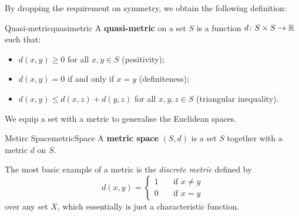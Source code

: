 \documentclass[math, code]{amznotes}
\theoremstyle{remark}
\begin{document}
By dropping the requirement on symmetry, we obtain the following definition:
\begin{dfnbox}{Quasi-metric}{quasimetric}
    A {\color{red} \textbf{quasi-metric}} on a set $S$ is a function $d \colon S \times S \to \mathbb{R}$ such that:
    \begin{itemize}
        \item $d\left(x, y\right) \geq 0$ for all $x, y \in S$ (positivity);
        \item $d\left(x, y\right) = 0$ if and only if $x = y$ (definiteness);
        \item $d\left(x, y\right) \leq d\left(x, z\right) + d\left(y, z\right)$ for all $x, y, z \in S$ (triangular inequality).
    \end{itemize}
\end{dfnbox}
We equip a set with a metric to generalise the Euclidean spaces.
\begin{dfnbox}{Metirc Space}{metricSpace}
    A {\color{red} \textbf{metric space}} $\left(S, d\right)$ is a set $S$ together with a metric $d$ on $S$.    
\end{dfnbox}
The most basic example of a metric is the \textit{discrete metric} defined by 
\begin{equation*}
    d\left(x, y\right) = \begin{cases}
        1 & \quad \textrm{if } x \neq y \\
        0 & \quad \textrm{if } x = y
    \end{cases}
\end{equation*}
over any set $X$, which essentially is just a characteristic function.
\end{document}
